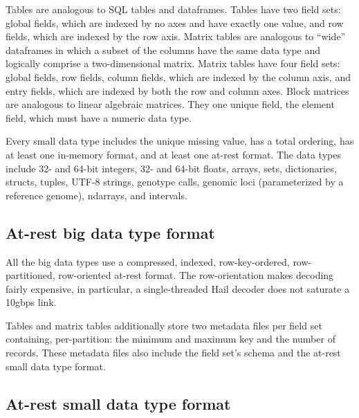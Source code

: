 \documentclass[sigconf, nonacm]{acmart}
\begin{document}
Tables are analogous to SQL tables and dataframes. Tables have two field sets: global fields, which
are indexed by no axes and have exactly one value, and row fields, which are indexed by the row
axis. Matrix tables are analogous to ``wide'' dataframes in which a subset of the columns have the
same data type and logically comprise a two-dimensional matrix. Matrix tables have four field sets:
global fields, row fields, column fields, which are indexed by the column axis, and entry fields,
which are indexed by both the row and column axes. Block matrices are analogous to linear algebraic
matrices. They one unique field, the element field, which must have a numeric data type.

Every small data type includes the unique missing value, has a total ordering, has at least one
in-memory format, and at least one at-rest format. The data types include 32- and 64-bit integers,
32- and 64-bit floats, arrays, sets, dictionaries, structs, tuples, UTF-8 strings, genotype calls,
genomic loci (parameterized by a reference genome), ndarrays, and intervals.

\subsection{At-rest big data type format}

All the big data types use a compressed, indexed, row-key-ordered, row-partitioned, row-oriented
at-rest format. The row-orientation makes decoding fairly expensive, in particular, a
single-threaded Hail decoder does not saturate a 10gbps link.

Tables and matrix tables additionally store two metadata files per field set containing,
per-partition: the minimum and maximum key and the number of records. These metadata files also
include the field set's schema and the at-rest small data type format.

\subsection{At-rest small data type format}


\end{document}
